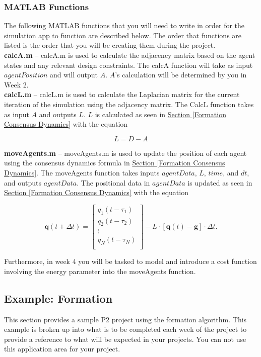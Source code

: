 \documentclass[../CourseManual.tex]{subfiles}
\begin{document}
\subsubsection{MATLAB Functions} \label{MATLAB Functions: Formation}
    The following MATLAB functions that you will need to write in order for the simulation app to function are described below. The order that functions are listed is the order that you will be creating them during the project.\\

    \textbf{calcA.m} --  calcA.m is used to calculate the adjacency matrix based on the agent states and any relevant design constraints. The calcA function will take as input $agentPosition$ and will output $A$. $A$'s calculation will be determined by you in Week 2. \\

    \textbf{calcL.m} -- calcL.m is used to calculate the Laplacian matrix for the current iteration of the simulation using the adjacency matrix. The CalcL function takes as input $A$ and outputs $L$. $L$ is calculated as seen in \hyperref[Formation Consensus Dynamics]{Section \ref{Formation Consensus Dynamics}} with the equation 

    $$L = D - A$$

    \textbf{moveAgents.m} -- moveAgents.m is used to update the position of each agent using the consensus dynamics formula in \hyperref[Formation Consensus Dynamics]{Section \ref{Formation Consensus Dynamics}}. The moveAgents function takes inputs $agentData$, $L$, $time$, and $dt$, and outputs $agentData$. The positional data in $agentData$ is updated as seen in \hyperref[Formation Consensus Dynamics]{Section \ref{Formation Consensus Dynamics}} with the equation 

    $$
    \boldsymbol{q}(t+\Delta t) =
    \begin{bmatrix}
    q_1(t-\tau_1)\\
    q_2(t-\tau_2)\\
    \vdots \\
    q_N(t-\tau_N)\\
    \end{bmatrix}
    - L \cdot [\boldsymbol{q}(t) - \boldsymbol{g}] \cdot \Delta t.
    $$

    Furthermore, in week 4 you will be tasked to model and introduce a cost function involving the energy parameter into the moveAgents function.

\subsection{Example: Formation} \label{Example: Formation}
    This section provides a sample P2 project using the formation algorithm. This example is broken up into what is to be completed each week of the project to provide a reference to what will be expected in your projects. You can not use this application area for your project.
\end{document}
